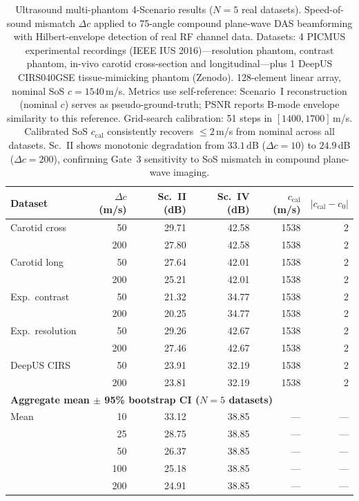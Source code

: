 \documentclass[11pt]{article}
\begin{document}
\begin{table}[htbp]
\centering
\caption{Ultrasound multi-phantom 4-Scenario results ($N{=}5$ real datasets). Speed-of-sound mismatch $\Delta c$ applied to 75-angle compound plane-wave DAS beamforming with Hilbert-envelope detection of real RF channel data.
Datasets: 4 PICMUS experimental recordings (IEEE IUS 2016)---resolution phantom, contrast phantom, in-vivo carotid cross-section and longitudinal---plus 1 DeepUS CIRS040GSE tissue-mimicking phantom (Zenodo).
128-element linear array, nominal SoS $c{=}1540$\,m/s.
Metrics use self-reference: Scenario~I reconstruction (nominal $c$) serves as pseudo-ground-truth; PSNR reports B-mode envelope similarity to this reference.
Grid-search calibration: 51 steps in $[1400, 1700]$\,m/s. Calibrated SoS $c_{\mathrm{cal}}$ consistently recovers $\leq 2$\,m/s from nominal across all datasets.
Sc.~II shows monotonic degradation from $33.1$\,dB ($\Delta c{=}10$) to $24.9$\,dB ($\Delta c{=}200$), confirming Gate~3 sensitivity to SoS mismatch in compound plane-wave imaging.}
\label{tab:us_scenes}
\small
\begin{tabular}{l r r r r r}
\toprule
Dataset & $\Delta c$ (m/s) & Sc.~II (dB) & Sc.~IV (dB) & $c_{\mathrm{cal}}$ (m/s) & $|c_{\mathrm{cal}} - c_0|$ \\
\midrule
Carotid cross   &  50 & 29.71 & 42.58 & 1538 & 2 \\
                & 200 & 27.80 & 42.58 & 1538 & 2 \\
Carotid long    &  50 & 27.64 & 42.01 & 1538 & 2 \\
                & 200 & 25.21 & 42.01 & 1538 & 2 \\
Exp.\ contrast  &  50 & 21.32 & 34.77 & 1538 & 2 \\
                & 200 & 20.25 & 34.77 & 1538 & 2 \\
Exp.\ resolution &  50 & 29.26 & 42.67 & 1538 & 2 \\
                 & 200 & 27.46 & 42.67 & 1538 & 2 \\
DeepUS CIRS     &  50 & 23.91 & 32.19 & 1538 & 2 \\
                & 200 & 23.81 & 32.19 & 1538 & 2 \\
\midrule
\multicolumn{6}{l}{\textbf{Aggregate mean $\pm$ 95\% bootstrap CI ($N{=}5$ datasets)}} \\
\midrule
Mean   &  10 & 33.12 & 38.85 & --- & --- \\
       &  25 & 28.75 & 38.85 & --- & --- \\
       &  50 & 26.37 & 38.85 & --- & --- \\
       & 100 & 25.18 & 38.85 & --- & --- \\
       & 200 & 24.91 & 38.85 & --- & --- \\
\bottomrule
\end{tabular}
\end{table}
\end{document}
